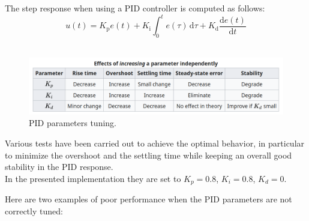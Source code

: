 \documentclass[11pt,a4paper]{article}
\begin{document}
The step response when using a PID controller is computed as follows:
$$
u(t)=K_{\text{p}}e(t)+K_{\text{i}}\int _{0}^{t}e(\tau )\,\mathrm {d} \tau +K_{\text{d}}{\frac {\mathrm {d} e(t)}{\mathrm {d} t}}
$$\\

\begin{figure}[H]
    \centering
    \includegraphics[scale=0.4]{other/PID_parameters_description.png}
    \caption{PID parameters tuning.}
\end{figure}

Various tests have been carried out to achieve the optimal behavior, in particular to minimize
the overshoot and the settling time while keeping an overall good stability in the PID response.\\

In the presented implementation they are set to $K_p = 0.8$, $K_i = 0.8$, $K_d = 0$.\\

\newpage

Here are two examples of poor performance when the PID parameters are not correctly tuned:
\end{document}
